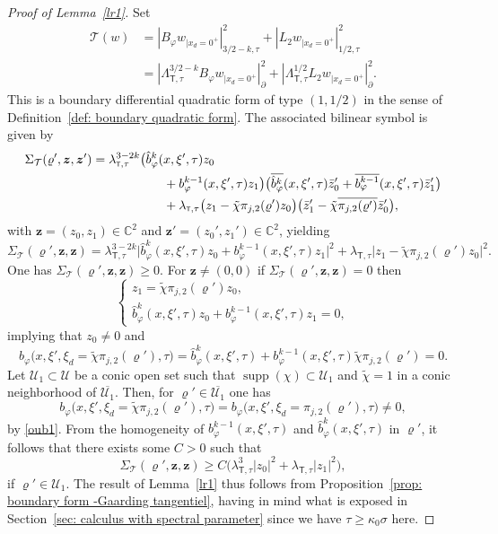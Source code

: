 \documentclass[10pt]{amsart}
\theoremstyle{plain}
\theoremstyle{definition}
\def\C{\mathbb{C}}
\newcommand{\nhd}{neighborhood\xspace}
\let\k\kappa
\let\y\varrho
\newcommand{\tchi}{\tilde{\chi}}
\newcommand{\ovl}[1]{\overline{#1}}
\newcommand{\un}[1]{\Sigma_{#1}}
\newcommand{\U}{\mathscr U}
\newcommand{\z}{\boldsymbol{z}}
\newcommand{\br}{\ensuremath{_{|x_d=0^+}}}
\newcommand{\norm}[2]{{|#1|}_{#2}}
\newcommand{\normsc}[2]{{| #1 |}_{#2, \tau}}
\newcommand{\lsct}{\lambda_{{\scriptscriptstyle{\mathsf T}},\tau}}
\newcommand{\Lsct}{\Lambda_{{\scriptscriptstyle{\mathsf T}},\tau}}
\DeclareMathOperator{\supp}{supp}
\begin{document}
\begin{proof}[Proof of Lemma~\ref{lr1}]
Set
\begin{align*}
\mathcal T(w) &= \normsc{B_\varphi w\br}{3/2-k}^2
+ \normsc{L_2 w\br}{1/2}^2\\
&=\norm{\Lsct^{3/2-k} B_\varphi w\br}{\partial}^2
+ \norm{\Lsct^{1/2} L_2 w\br}{\partial}^2.
\end{align*}
This is a boundary differential quadratic form of type $(1,1/2)$ in
the sense of Definition~\ref{def: boundary quadratic form}.
The associated bilinear symbol is given by
\begin{align*}
\un{\mathcal T}(\y',\z,\z')
&= \lsct^{3-2k} \big (\hat{b}^k_{\varphi}(x,\xi',\tau) z_0 \\
&\hspace*{2cm} +
b^{k-1}_{\varphi}(x,\xi',\tau) z_1\big)
\big(\ovl{\hat{b}^k_{\varphi}}(x,\xi',\tau) \bar{z}_0'+
\ovl{ b^{k-1}_{\varphi}}(x,\xi',\tau) \bar{z}_1'\big)\\
&\hspace*{2cm} + \lsct \big(z_1 - \tchi \pi_{j,2}(\y') z_0 \big)
\big(\bar{z}_1' - \tchi \ovl{\pi_{j,2}(\y')}\bar{z}_0'\big),
\end{align*}
with $\z = (z_0, z_1) \in \C^2$ and $\z' = (z_0', z_1') \in \C^2$,
yielding
\[
\un{\mathcal T}(\y',\z,\z)
= \lsct^{3-2k} \big |\hat{b}^k_{\varphi}(x,\xi',\tau) z_0 +
b^{k-1}_{\varphi}(x,\xi',\tau) z_1\big|^2 
 + \lsct \big|z_1 - \tchi \pi_{j,2}(\y') z_0 \big|^2.
\]
One has $\un{\mathcal T}(\y',\z,\z)\geq 0$.
For $\z\neq (0,0)$ if $\un{\mathcal T}(\y',\z,\z)=0$ then
\begin{equation*}
\begin{cases}
z_1 = \tchi \pi_{j,2}(\y') z_0,\\
\hat{b}^k_{\varphi}(x,\xi',\tau) z_0 +
b^{k-1}_{\varphi}(x,\xi',\tau) z_1=0,
\end{cases}
\end{equation*}
implying that $z_0 \neq 0$ and
\begin{equation*}
b_\varphi \big(x,\xi', \xi_d= \tchi \pi_{j,2}(\y'), \tau \big)
= \hat{b}^k_{\varphi}(x,\xi',\tau) +
b^{k-1}_{\varphi}(x,\xi',\tau) \tchi \pi_{j,2}(\y') =0.
\end{equation*}
Let $\U_1 \subset \U$ be a conic open set such that $\supp(\chi)
\subset \U_1$ and $\tchi=1$ in a conic \nhd of
$\ovl{\U_1}$. Then, for $\y' \in \ovl{\U_1}$ one has
\begin{equation*}
b_\varphi \big(x,\xi', \xi_d= \tchi \pi_{j,2}(\y'), \tau \big)
= b_\varphi \big(x,\xi', \xi_d= \pi_{j,2}(\y'), \tau \big) \neq 0,
\end{equation*}
by \eqref{oub1}. From the homogeneity of
$b^{k-1}_{\varphi}(x,\xi',\tau)$ and
$\hat{b}^k_{\varphi}(x,\xi',\tau)$ in $\y'$,
it follows that there exists some $C>0$ such that
\begin{equation*}
\un{\mathcal T}(\y',\z,\z) \geq C \big(\lsct^3 |z_0|^2 + \lsct |z_1|^2 \big),
\end{equation*}
if $\y' \in \U_1$.
The result of Lemma~\ref{lr1} thus follows from Proposition~\ref{prop:
boundary form -Gaarding tangentiel}, having in mind what is exposed in
Section~\ref{sec: calculus with spectral parameter} since we have $\tau \geq \k_0 \sigma$ here.
\end{proof}
\end{document}
